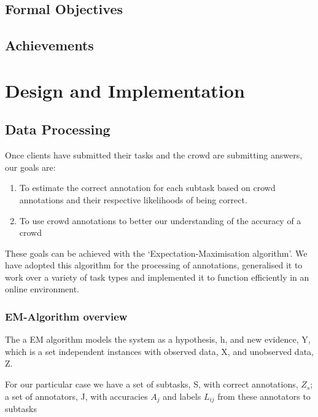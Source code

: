 \documentclass[11pt]{article}
\begin{document}
\subsection{Formal Objectives}
\subsection{Achievements}


\section{Design and Implementation}

\subsection{Data Processing}

Once clients have submitted their tasks and the crowd are submitting answers, our goals are:
\begin{enumerate}
\item To estimate the correct annotation for each subtask based on crowd annotations and their respective likelihoods of being correct.
\item To use crowd annotations to better our understanding of the accuracy of a crowd
\end{enumerate}

These goals can be achieved with the `Expectation-Maximisation algorithm'. We have adopted this algorithm for the processing of annotations, generalised it to work over a variety of task types and implemented it to function efficiently in an online environment.\\

\subsubsection{EM-Algorithm overview}

The a EM algorithm models the system as a hypothesis, h, and new evidence, Y, which is a set independent instances with observed data, X, and unobserved data, Z.

For our particular case we have a set of subtasks, S, with correct annotations, $Z_{s}$; a set of annotators, J, with accuracies $A_{j}$ and labels $L_{ij}$ from these annotators to subtasks
\end{document}
